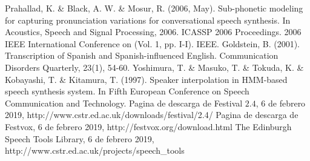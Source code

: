 \begin{thebibliography}{9}
 Prahallad, K. \& Black, A. W. \& Mosur, R. (2006, May). Sub-phonetic modeling for capturing pronunciation variations for conversational speech synthesis. In Acoustics, Speech and Signal Processing, 2006. ICASSP 2006 Proceedings. 2006 IEEE International Conference on (Vol. 1, pp. I-I). IEEE.
  Goldstein, B. (2001). Transcription of Spanish and Spanish-influenced English. Communication Disorders Quarterly, 23(1), 54-60.
 Yoshimura, T. \& Masuko, T. \& Tokuda, K. \& Kobayashi, T. \& Kitamura, T. (1997). Speaker interpolation in HMM-based speech synthesis system. In Fifth European Conference on Speech Communication and Technology.
 Pagina de descarga de Festival $2.4$, 6 de febrero 2019, http://www.cstr.ed.ac.uk/downloads/festival/2.4/
 Pagina de descarga de Festvox, 6 de febrero 2019, http://festvox.org/download.html
 The Edinburgh Speech Tools Library, 6 de febrero 2019, http://www.cstr.ed.ac.uk/projects/speech\_tools
\end{thebibliography}
